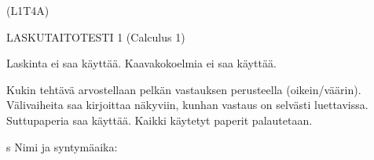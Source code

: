 \documentclass[finnish, a4paper, 12pt]{article}
\begin{document}
	
	
	\begin{flushright}
		(L1T4A)	%
	\end{flushright}
	
	\begin{center}
		{\large
			LASKUTAITOTESTI 1 (Calculus 1)}
	\end{center}
	
	Laskinta ei saa käyttää. Kaavakokoelmia ei saa käyttää.
	
	Kukin tehtävä arvostellaan pelkän vastauksen perusteella (oikein/väärin).
	Välivaiheita saa kirjoittaa näkyviin, kunhan vastaus on selvästi luettavissa.
	Suttupaperia saa käyttää. Kaikki käytetyt paperit palautetaan.
	
s\vspace{12pt}
Nimi ja syntymäaika: \phantom{m} \hrulefill
\vspace{8pt}
	
\end{document}
